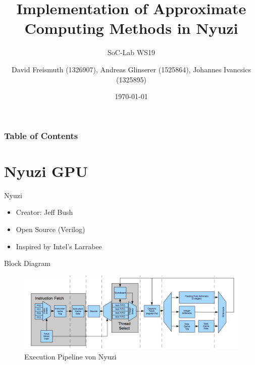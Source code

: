 \documentclass{beamer}
\title[Implementation of Approximate Computing Methods in Nyuzi] %
{Implementation of Approximate Computing Methods in Nyuzi}
\subtitle{SoC-Lab WS19}
\author[David Freismuth (1326907), Andreas Glinserer (1525864), \\
Johannes Ivancsics (1325895)] %
{David Freismuth (1326907), Andreas Glinserer (1525864), Johannes Ivancsics (1325895)}
\date[\today] %
{\today}
\begin{document}
\frame{\titlepage}


\begin{frame}
\frametitle{Table of Contents}
\tableofcontents
\end{frame}

\section{Nyuzi GPU}
\begin{frame}{Nyuzi}
    \begin{itemize}
        \item<1-> Creator: Jeff Bush \cite{Nyuzi}
        \item<2-> Open Source (Verilog)
        \item<3-> Inspired by Intel's Larrabee \cite{Seiler:2008:LMX:1360612.1360617}
    \end{itemize}
\end{frame}
\begin{frame}{Block Diagram}
    \begin{figure}
        \includegraphics[width=\linewidth]{nyuzi-execute-pipeline}
        \caption{Execution Pipeline von Nyuzi}
    \end{figure}
\end{frame}
\end{document}
